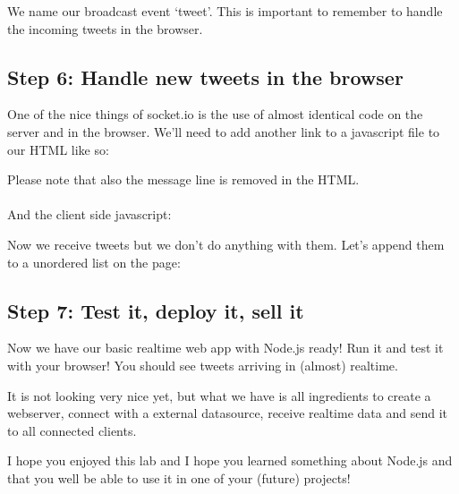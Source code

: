 \documentclass[a4paper]{report}
\begin{document}
\noindent We name our broadcast event `tweet'. This is important to remember to handle the incoming tweets in the browser.

\subsection*{Step 6: Handle new tweets in the browser}

One of the nice things of socket.io is the use of almost identical code on the server and in the browser. We'll need to add another link to a javascript file to our HTML like so:



\noindent Please note that also the message line is removed in the HTML.
\\
\\
\noindent And the client side javascript:



\noindent Now we receive tweets but we don't do anything with them. Let's append them to a unordered list on the page:



\subsection*{Step 7: Test it, deploy it, sell it}
Now we have our basic realtime web app with Node.js ready! Run it and test it with your browser! You should see tweets arriving in (almost) realtime. 

It is not looking very nice yet, but what we have is all ingredients to create a webserver, connect with a external datasource, receive realtime data and send it to all connected clients.

I hope you enjoyed this lab and I hope you learned something about Node.js and that you well be able to use it in one of your (future) projects!
\end{document}
